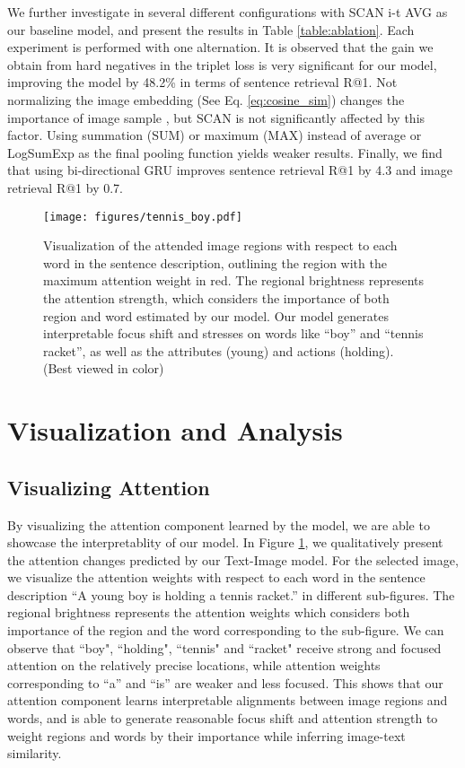 \documentclass[runningheads]{llncs}
\begin{document}
We further investigate in several different configurations with SCAN i-t AVG as our baseline model, and present the results in Table \ref{table:ablation}. Each experiment is performed with one alternation. It is observed that the gain we obtain from hard negatives in the triplet loss is very significant for our model, improving the model by 48.2\% in terms of sentence retrieval R@1. Not normalizing the image embedding (See Eq. \eqref{eq:cosine_sim}) changes the importance of image sample \cite{faghri2017vse++}, but SCAN is not significantly affected by this factor. Using summation (SUM) or maximum (MAX) instead of average or LogSumExp as the final pooling function yields weaker results. Finally, we find that using bi-directional GRU improves sentence retrieval R@1 by 4.3 and image retrieval R@1 by 0.7. 


\begin{figure}[t!]
\centering
\texttt{[image: figures/tennis\_boy.pdf]}
\caption{Visualization of the attended image regions with respect to each word in the sentence description, outlining the region with the maximum attention weight in red. The regional brightness represents the attention strength, which considers the importance of both region and word estimated by our model. Our model generates interpretable focus shift and stresses on words like ``boy'' and ``tennis racket'', as well as the attributes (young) and actions (holding). (Best viewed in color)}
\label{fig:attn_vis}
\end{figure}

\section{Visualization and Analysis}

\subsection{Visualizing Attention}

By visualizing the attention component learned by the model, we are able to showcase the interpretablity of our model. In Figure \ref{fig:attn_vis}, we qualitatively present the attention changes predicted by our Text-Image model. For the selected image, we visualize the attention weights with respect to each word in the sentence description ``A young boy is holding a tennis racket.'' in different sub-figures. The regional brightness represents the attention weights which considers both importance of the region and the word corresponding to the sub-figure. We can observe that ``boy", ``holding", ``tennis" and ``racket" receive strong and focused attention on the relatively precise locations, while attention weights corresponding to ``a'' and ``is'' are weaker and less focused. This shows that our attention component learns interpretable alignments between image regions and words, and is able to generate reasonable focus shift and attention strength to weight regions and words by their importance while inferring image-text similarity.
\end{document}
